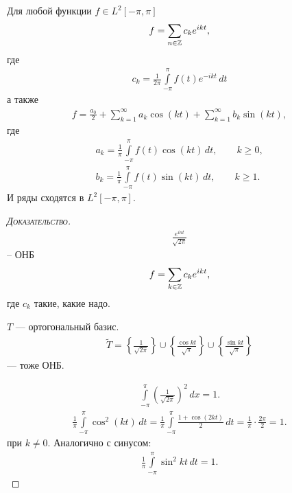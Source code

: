 \documentclass[../complex-analysis.tex]{subfiles}
\begin{document}
\begin{crly}
 Для любой функции $ f \in L^{2}[-\pi,\pi] $
 \begin{align*}
  f = \sum_{n \in \mathbb{Z}} c_k e^{ikt},
 \end{align*} где \begin{align*}
  c_k = \frac{1}{2\pi} \int\limits_{-\pi}^{\pi} f(t)e^{-ikt}\,dt
 \end{align*}а также
 \begin{align*}
  f = \frac{a_0}{2}+ \sum_{k=1}^{\infty} a_k \cos(kt) + \sum_{k=1}^{\infty} b_k\sin(kt),
 \end{align*} где
 \begin{align*}
  a_k = \frac{1}{\pi} \int\limits_{-\pi}^{\pi} f(t)\cos(kt)\,dt, \qquad k \geqslant 0, \\
  b_k = \frac{1}{\pi} \int\limits_{-\pi}^{\pi} f(t)\sin(kt)\,dt, \qquad k \geqslant 1.
 \end{align*} И ряды сходятся в $ L^{2}[-\pi,\pi] $.
\end{crly}
\begin{proof}[\normalfont\textsc{Доказательство}]
 \begin{align*}
  \frac{e^{int}}{\sqrt{2\pi}}
 \end{align*} -- ОНБ
 \begin{align*}
  f = \sum_{k\in\mathbb{Z}} c_k e^{ikt},
 \end{align*} где $ c_k $ такие, какие надо.

 $ T $ --- ортогональный базис. 
 \begin{align*}
  \tilde T = \left\{ \frac{1}{\sqrt{2\pi}} \right\} \cup \left\{ \frac{\cos kt}{\sqrt \pi} \right\} \cup \left\{ \frac{\sin kt}{\sqrt \pi} \right\}
 \end{align*} --- тоже ОНБ.

 \begin{align*}
  \int\limits_{-\pi}^{\pi} \left( \frac{1}{\sqrt{2\pi}} \right)^{2}\,dx = 1.
 \end{align*}
 \begin{align*}
  \frac{1}{\pi} \int\limits_{-\pi}^{\pi} \cos^{2}(kt)\,dt = \frac{1}{\pi}\int\limits_{-\pi}^{\pi} \frac{1+\cos(2kt)}{2}\,dt = \frac{1}{\pi} \cdot \frac{2\pi}{2} = 1.
 \end{align*} при $ k \neq 0 $. Аналогично с синусом:
 \begin{align*}
  \frac{1}{\pi} \int\limits_{-\pi}^{\pi} \sin^{2}kt\,dt=1.
 \end{align*}
\end{proof}
\end{document}
